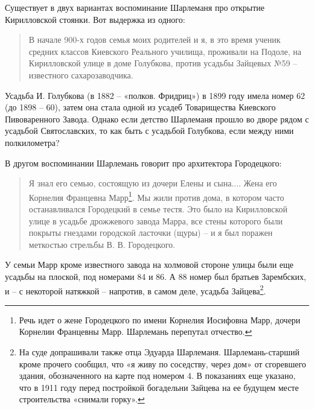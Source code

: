 
Существует в двух вариантах воспоминание Шарлеманя про открытие Кирилловской стоянки. Вот выдержка из одного:

\begin{quotation}
В начале 900-х годов семья моих родителей и я, в это время ученик средних классов Киевского Реального училища, проживали на Подоле, на Кирилловской улице в доме Голубкова, против усадьбы Зайцевых №59 – известного сахарозаводчика.
\end{quotation}

Усадьба И. Голубкова (в 1882 – «полков. Фридриц») в 1899 году имела номер 62 (до 1898 – 60), затем она стала одной из усадеб Товарищества Киевского Пивоваренного Завода. Однако если детство Шарлеманя прошло во дворе рядом с усадьбой Святославских, то как быть с усадьбой Голубкова, если между ними полкилометра?




В другом воспоминании Шарлемань говорит про архитектора Городецкого:

\begin{quotation}
Я знал его семью, состоящую из дочери Елены и сына.... Жена его Корнелия Францевна Марр\footnote{Речь идет о жене Городецкого по имени Корнелия Иосифовна Марр, дочери Корнелии Францевны Марр. Шарлемань перепутал отчество.}. Мы жили против дома, в котором часто останавливался Городецкий в семье тестя. Это было на Кирилловской улице в усадьбе дрожжевого завода Марра, все стены которого были покрыты гнездами городской ласточки (щуры) – и я был поражен меткостью стрельбы В. В. Городецкого.
\end{quotation}

У семьи Марр кроме известного завода на холмовой стороне улицы были еще усадьбы на плоской, под номерами 84 и 86. А 88 номер был братьев Зарембских, и – с некоторой натяжкой – напротив, в самом деле, усадьба Зайцева\footnote{На суде допрашивали также отца Эдуарда Шарлеманя. Шарлемань-старший кроме прочего сообщил, что «я живу по соседству, через дом» от сгоревшего здания, обозначенного на карте под номером 4. В показаниях еще указано, что в 1911 году перед постройкой богадельни Зайцева на ее будущем месте строительства «снимали горку».}.

